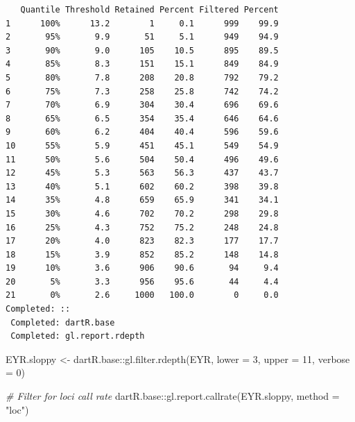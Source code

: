 \documentclass[
  letterpaper,
  DIV=11,
  numbers=noendperiod]{scrreprt}
\newenvironment{Shaded}{\begin{snugshade}}{\end{snugshade}}
\newcommand{\AttributeTok}[1]{\textcolor[rgb]{0.49,0.56,0.16}{#1}}
\newcommand{\CommentTok}[1]{\textcolor[rgb]{0.38,0.63,0.69}{\textit{#1}}}
\newcommand{\DecValTok}[1]{\textcolor[rgb]{0.25,0.63,0.44}{#1}}
\newcommand{\FunctionTok}[1]{\textcolor[rgb]{0.02,0.16,0.49}{#1}}
\newcommand{\NormalTok}[1]{\textcolor[rgb]{0.00,0.44,0.13}{#1}}
\newcommand{\OtherTok}[1]{\textcolor[rgb]{0.00,0.44,0.13}{#1}}
\newcommand{\SpecialCharTok}[1]{\textcolor[rgb]{0.25,0.44,0.63}{#1}}
\newcommand{\StringTok}[1]{\textcolor[rgb]{0.25,0.44,0.63}{#1}}
\let\textttOrig\texttt
\renewcommand{\texttt}[1]{\textttOrig{\color{blue}{#1}}}
\begin{document}
\begin{verbatim}
   Quantile Threshold Retained Percent Filtered Percent
1      100%      13.2        1     0.1      999    99.9
2       95%       9.9       51     5.1      949    94.9
3       90%       9.0      105    10.5      895    89.5
4       85%       8.3      151    15.1      849    84.9
5       80%       7.8      208    20.8      792    79.2
6       75%       7.3      258    25.8      742    74.2
7       70%       6.9      304    30.4      696    69.6
8       65%       6.5      354    35.4      646    64.6
9       60%       6.2      404    40.4      596    59.6
10      55%       5.9      451    45.1      549    54.9
11      50%       5.6      504    50.4      496    49.6
12      45%       5.3      563    56.3      437    43.7
13      40%       5.1      602    60.2      398    39.8
14      35%       4.8      659    65.9      341    34.1
15      30%       4.6      702    70.2      298    29.8
16      25%       4.3      752    75.2      248    24.8
17      20%       4.0      823    82.3      177    17.7
18      15%       3.9      852    85.2      148    14.8
19      10%       3.6      906    90.6       94     9.4
20       5%       3.3      956    95.6       44     4.4
21       0%       2.6     1000   100.0        0     0.0
Completed: :: 
 Completed: dartR.base 
 Completed: gl.report.rdepth 
\end{verbatim}

\begin{Shaded}
\begin{Highlighting}[]
\NormalTok{EYR.sloppy }\OtherTok{\textless{}{-}}\NormalTok{ dartR.base}\SpecialCharTok{::}\FunctionTok{gl.filter.rdepth}\NormalTok{(EYR, }\AttributeTok{lower =} \DecValTok{3}\NormalTok{, }\AttributeTok{upper =} \DecValTok{11}\NormalTok{, }\AttributeTok{verbose =} \DecValTok{0}\NormalTok{)}
\end{Highlighting}
\end{Shaded}

\begin{figure}[H]

{\centering \texttt{[image: Session10\_SexLinkedMarkers\_files/figure-pdf/unnamed-chunk-13-2.pdf]}

}

\end{figure}

\begin{Shaded}
\begin{Highlighting}[]
\CommentTok{\# Filter for loci call rate}
\NormalTok{dartR.base}\SpecialCharTok{::}\FunctionTok{gl.report.callrate}\NormalTok{(EYR.sloppy, }\AttributeTok{method =} \StringTok{"loc"}\NormalTok{)}
\end{Highlighting}
\end{Shaded}
\end{document}
